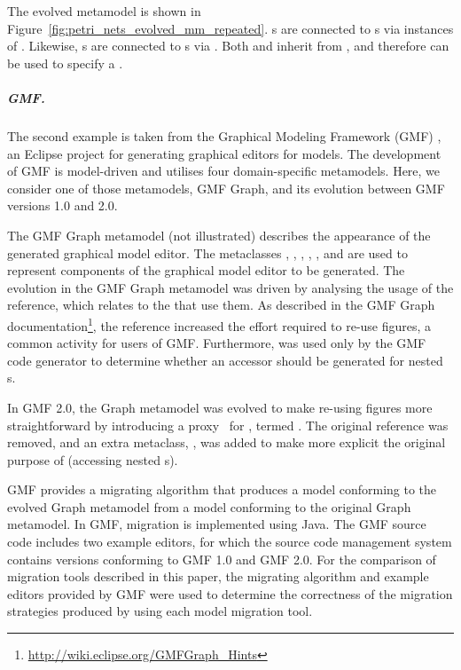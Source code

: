The evolved metamodel is shown in Figure~\ref{fig:petri_nets_evolved_mm_repeated}. s are connected to s via instances of . Likewise, s are connected to s via . Both  and  inherit from , and therefore can be used to specify a .

\subparagraph{GMF.}
The second example is taken from the Graphical Modeling Framework (GMF) \cite{gronback09emp}, an Eclipse project for generating graphical editors for models. The development of GMF is model-driven and utilises four domain-specific metamodels. Here, we consider one of those metamodels, GMF Graph, and its evolution between GMF versions 1.0 and 2.0. 

The GMF Graph metamodel (not illustrated) describes the appearance of the generated graphical model editor. The metaclasses , , , , , and  are used to represent components of the graphical model editor to be generated. The evolution in the GMF Graph metamodel was driven by analysing the usage of the  reference, which relates  to the  that use them. As described in the GMF Graph documentation\footnote{\url{http://wiki.eclipse.org/GMFGraph_Hints}}, the  reference increased the effort required to re-use figures, a common activity for users of GMF. Furthermore,  was used only by the GMF code generator to determine whether an accessor
should be generated for nested s.

In GMF 2.0, the Graph metamodel was evolved to make re-using figures more straightforward by introducing a proxy~\cite{gamma95patterns} for , termed . The original  reference was removed, and an extra metaclass, , was added to make more explicit the original purpose of  (accessing nested s).

GMF provides a migrating algorithm that produces a model conforming to the evolved Graph metamodel from a model conforming to the original Graph metamodel. In GMF, migration is implemented using Java. The GMF source code includes two example editors, for which the source code management system contains versions conforming to GMF 1.0 and GMF 2.0. For the comparison of migration tools described in this paper, the migrating algorithm and example editors provided by GMF were used to determine the correctness of the migration strategies produced by using each model migration tool. 

